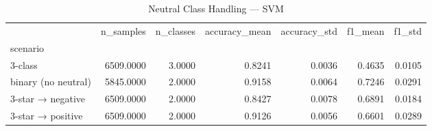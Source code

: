 \begin{table}
\caption{Neutral Class Handling — SVM}
\begin{tabular}{lrrrrrr}
\toprule
 & n_samples & n_classes & accuracy_mean & accuracy_std & f1_mean & f1_std \\
scenario &  &  &  &  &  &  \\
\midrule
3-class & 6509.0000 & 3.0000 & 0.8241 & 0.0036 & 0.4635 & 0.0105 \\
binary (no neutral) & 5845.0000 & 2.0000 & 0.9158 & 0.0064 & 0.7246 & 0.0291 \\
3-star → negative & 6509.0000 & 2.0000 & 0.8427 & 0.0078 & 0.6891 & 0.0184 \\
3-star → positive & 6509.0000 & 2.0000 & 0.9126 & 0.0056 & 0.6601 & 0.0289 \\
\bottomrule
\end{tabular}
\end{table}
